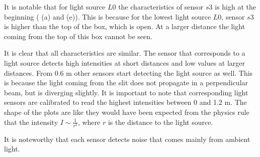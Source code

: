 \begin{description}
It is notable that for light source $L0$ the characteristics of sensor $s3$ is high at the beginning ( (a) and (e)). This is because for the lowest light source $L0$, sensor $s3$ is higher than the top of the box, which is open. At a larger distance the light coming from the top of this box cannot be seen. 

It is clear that all characteristics are similar. The sensor that corresponds to a light source detects high intensities at short distances and low values at larger distances. From 0.6 m other sensors start detecting the light source as well. This is because the light coming from the slit does not propagate in a perpendicular beam, but is diverging slightly. It is important to note that corresponding light sensors are calibrated to read the highest intensities between 0 and 1.2 m. The shape of the plots are like they would have been expected from the physics rule that the intensity $I \sim \frac{1}{r^2}$, where $r$ is the distance to the light source.

It is noteworthy that each sensor detects noise that comes mainly from ambient light.
\end{description}

